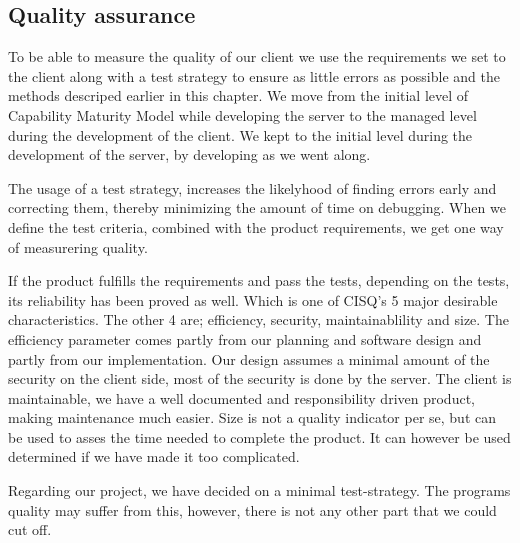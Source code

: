 \subsection{Quality assurance}
To be able to measure the quality of our client we use the requirements we set to the client along with a test strategy to ensure as little errors as possible and the methods descriped earlier in this chapter. We move from the initial level of Capability Maturity Model while developing the server to the managed level during the development of the client. We kept to the initial level during the development of the server, by developing as we went along.

The usage of a test strategy, increases the likelyhood of finding errors early and correcting them, thereby minimizing the amount of time on debugging. When we define the test criteria, combined with the product requirements, we get one way of measurering quality.

 If the product fulfills the requirements and pass the tests, depending on the tests, its reliability has been proved as well. Which is one of CISQ's 5 major desirable characteristics. The other 4 are; efficiency, security, maintainablility and size. The efficiency parameter comes partly from our planning and software design and partly from our implementation.
 Our design assumes a minimal amount of the security on the client side, most of the security is done by the server.
 The client is maintainable, we have a well documented and responsibility driven product, making maintenance much easier. 
 Size is not a quality indicator per se, but can be used to asses the time needed to complete the product. It can however be used determined if we have made it too complicated.
 
 Regarding our project, we have decided on a minimal test-strategy. The programs quality may suffer from this, however, there is not any other part that we could cut off.